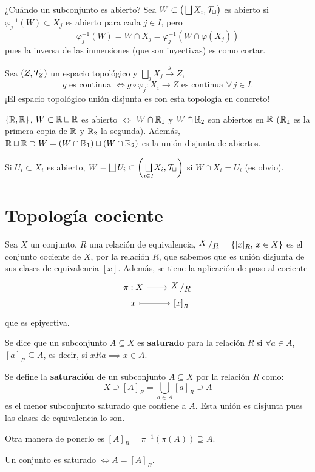 ¿Cu\'ando un subconjunto es abierto? Sea $W \subset \big(\bigsqcup X_i, \mathcal{T}_{\sqcup}\big)$ es abierto si $\varphi_j^{-1}(W)\subset X_j$ es abierto para cada $j\in I$, pero $$\varphi_j^{-1}(W) = W\cap X_j = \varphi_j^{-1}(W\cap \varphi(X_j))$$
pues la inversa de las inmersiones (que son inyectivas) es como cortar.

Sea $(Z, \mathcal{T}_Z)$ un espacio topol\'ogico y $\bigsqcup_j X_j \overset{g}{\longrightarrow} Z$,
$$ g \text{ es continua }\iff g\circ \varphi_j: X_i \longrightarrow Z \text{ es continua } \forall \, j \in I. $$
¡El espacio topológico unión disjunta es con esta topología en concreto!
\begin{ejem}
    $\{\mathbb{R}, \mathbb{R}\}$, $W\subset \mathbb{R} \sqcup \mathbb{R}$ es abierto $\iff$ $W \cap \mathbb{R}_1$ y $W\cap \mathbb{R}_2$ son abiertos en $\mathbb{R}$ ($\mathbb{R}_1$ es la primera copia de $\mathbb{R}$ y $\mathbb{R}_2$ la segunda). Además, $\mathbb{R} \sqcup \mathbb{R}\supset W = (W\cap \mathbb{R}_1) \sqcup (W\cap \mathbb{R}_2)$ es la uni\'on disjunta de abiertos.
\end{ejem}
Si $U_i \subset X_i$ es abierto, $W=\bigsqcup U_i \subset \left( \underset{i \in I}{\bigsqcup} X_i, \mathcal{T}_{\sqcup} \right)$ si $W\cap X_i = U_i$ (es obvio).
\section{Topolog\'ia cociente}
Sea $X$ un conjunto, $R$ una relaci\'on de equivalencia, $\modulo{X}{R} = \{[x]_R, \, x\in X\}$ es el conjunto cociente de $X$, por la relaci\'on $R$, que sabemos que es uni\'on disjunta de sus clases de equivalencia $[x]$. Además, se tiene la aplicación de paso al cociente
$$\bt \pi: X \rar & \modulo{X}{R} \\[-6mm] x \rarmaps & \left[x\right]_R  \et$$
que es epiyectiva.
\begin{defi}    
Se dice que un subconjunto $A \subseteq X$ es \textbf{saturado} para la relación $R$ si $\forall a \in A$, $[a]_R \subseteq A$, es decir, si $x R a \implies x \in A$.
\end{defi}
\begin{defi}    
Se define la \textbf{saturación} de un subconjunto $A \subseteq X$ por la relación $R$ como:
\[
    X \supseteq [A]_R = \bigcup_{a \in A} [a]_R \supseteq A
\]
es el menor subconjunto saturado que contiene a $A$. Esta uni\'on es disjunta pues las clases de equivalencia lo son.

Otra manera de ponerlo es $[A]_R = \pi^{-1}(\pi(A)) \supseteq A$.
\end{defi}
\begin{prop}
    Un conjunto es saturado $\iff A = [A]_R$.
\end{prop}

